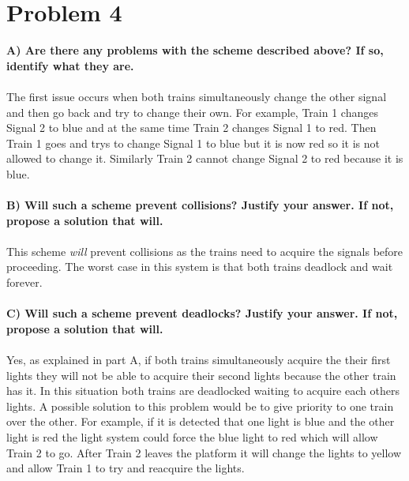 \documentclass{article}
\begin{document}
\section*{Problem 4}
\textbf{A) Are there any problems with the scheme described above? If so, identify what they are.}
\\\\
The first issue occurs when both trains simultaneously change the other signal and then go back and try to change their own. For example,
Train 1 changes Signal 2 to blue and at the same time Train 2 changes Signal 1 to red. Then Train 1 goes and trys to change Signal 1 to blue
but it is now red so it is not allowed to change it. Similarly Train 2 cannot change Signal 2 to red because it is blue.
\\\\
\textbf{B) Will such a scheme prevent collisions? Justify your answer. If not, propose a solution that will.}
\\\\
This scheme \emph{will} prevent collisions as the trains need to acquire the signals before proceeding. The worst case in this system is that
both trains deadlock and wait forever.
\\\\
\textbf{C) Will such a scheme prevent deadlocks? Justify your answer. If not, propose a solution that will.}
\\\\
Yes, as explained in part A, if both trains simultaneously acquire the their first lights they will not be able to acquire their second lights because
the other train has it. In this situation both trains are deadlocked waiting to acquire each others lights. A possible solution to this problem would
be to give priority to one train over the other. For example, if it is detected that one light is blue and the other light is red the light system could
force the blue light to red which will allow Train 2 to go. After Train 2 leaves the platform it will change the lights to yellow and allow Train 1 to 
try and reacquire the lights.

\newpage
\end{document}
